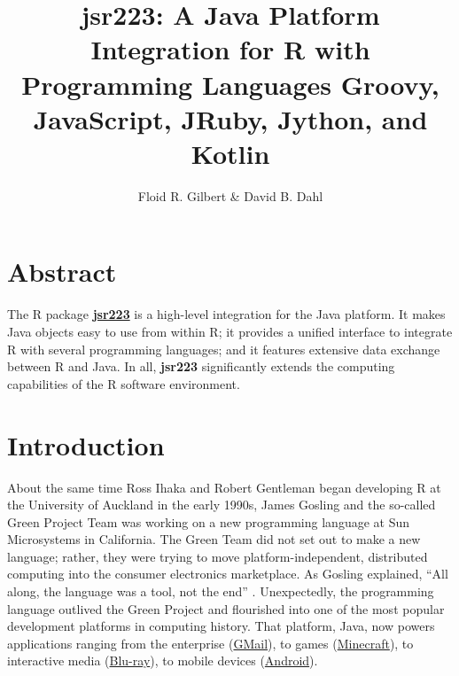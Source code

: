 \documentclass[
article,
11pt, %
a4paper, %
oneside, %
headinclude,footinclude, %
]{scrartcl}
\title{\normalfont jsr223: A Java Platform Integration for R with Programming Languages Groovy, JavaScript, JRuby, Jython, and Kotlin}
\author{Floid R. Gilbert \& David B. Dahl}
\date{}
\theoremstyle{definition} %
\theoremstyle{plain} %
\theoremstyle{remark} %
\newcommand{\pkg}[1]{\textbf{#1}}
\newcommand{\CRANpkg}[1]{\href{https://CRAN.R-project.org/package=#1}{\pkg{#1}}}
\begin{document}
\renewcommand{\sectionmark}[1]{\markright{#1}} %
\lehead{\mbox{\llap{\small\thepage\kern1em\color{halfgray} \vline}\color{halfgray}\hspace{0.5em}\rightmark\hfil}} %

\pagestyle{scrheadings}

\maketitle

\section*{Abstract} %

The R package \CRANpkg{jsr223} is a high-level integration for the Java platform. It makes Java objects easy to use from within R; it provides a unified interface to integrate R with several programming languages; and it features extensive data exchange between R and Java. In all, \pkg{jsr223} significantly extends the computing capabilities of the R software environment.
\clearpage

\setcounter{tocdepth}{2}

\tableofcontents

\newpage

\section{Introduction}

About the same time Ross Ihaka and Robert Gentleman began developing R at the University of Auckland in the early 1990s, James Gosling and the so-called Green Project Team was working on a new programming language at Sun Microsystems in California. The Green Team did not set out to make a new language; rather, they were trying to move platform-independent, distributed computing into the consumer electronics marketplace. As Gosling explained, ``All along, the language was a tool, not the end'' \citep{javainsidestory}. Unexpectedly, the programming language outlived the Green Project and flourished into one of the most popular development platforms in computing history. That platform, Java, now powers applications ranging from the enterprise (\href{https://www.google.com/gmail/about/}{GMail}), to games (\href{https://minecraft.net}{Minecraft}), to interactive media (\href{https://en.wikipedia.org/wiki/Blu-ray}{Blu-ray}), to mobile devices (\href{https://www.android.com/}{Android}).
\end{document}
